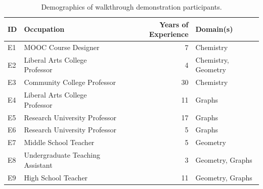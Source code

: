 \begin{table}
    \centering
    \begin{tabular}{l|l|r|l}
        \textbf{ID} & \textbf{Occupation} & \textbf{Years of Experience} & \textbf{Domain(s)}    \\
        \hline
        E1 & MOOC Course Designer       &  7 & Chemistry           \\ 
        E2 & Liberal Arts College Professor &  4 & Chemistry, Geometry \\
        E3 & Community College Professor    & 30 & Chemistry           \\
        E4 & Liberal Arts College Professor & 11 & Graphs              \\
        E5 & Research University Professor  & 17 & Graphs              \\
        E6 & Research University Professor  &  5 & Graphs              \\
        E7 & Middle School Teacher      &  5 & Geometry            \\
        E8 & Undergraduate Teaching Assistant &  3 & Geometry, Graphs    \\
        E9 & High School Teacher        & 11 & Geometry, Graphs    \\
    \end{tabular}

    \caption{Demographics of walkthrough demonstration participants.}
    \label{tab:demographics}
\end{table}

